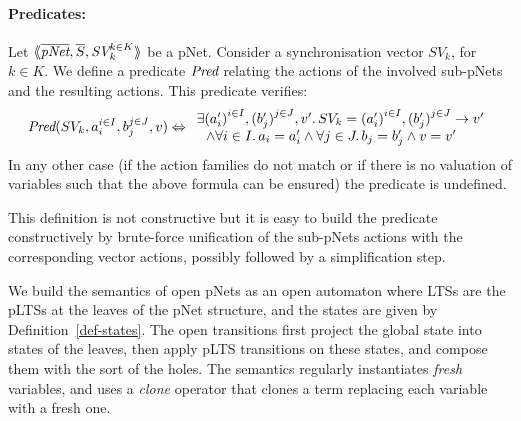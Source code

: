 \documentclass{lncs/llncs}
\newcommand{\Pred}{\symb{Pred}}
\begin{document}
\paragraph{Predicates:}
Let
$\mylangle\overline{\pNet},\overline{S},\symb{SV}_k^{k\in K} \myrangle$
be a pNet. Consider a synchronisation vector $SV_k$, for $k\in K$. We define a
predicate $\Pred$ relating
the actions of the involved sub-pNets and the resulting actions. This predicate verifies:
\[\Pred(SV_k, a_i^{i\in I}, b_j^{j\in J}, v)\Leftrightarrow
\begin{array}{l}
\exists {(a'_i)}^{i\in I},
{(b'_j)}^{j\in J},v'.\, SV_k={(a'_i)}^{i\in I}, {(b'_j)}^{j\in J}\rightarrow v'
\\~~\land
\forall i\in I.\, a_i=a'_i\land \forall j \in J.\, b_j=b'_j \land v=v'
\end{array}\]
In any other case (if the action families do not match or if there is no valuation of
variables such that the above formula can be ensured) the predicate is undefined.

This definition is not constructive but it is easy to build the predicate constructively
by brute-force unification of the sub-pNets
actions with the corresponding vector actions, possibly followed by a simplification
step.


We build the semantics of open pNets as an open automaton where LTSs are the pLTSs at
the leaves of the pNet structure, and the states are given by 
Definition~\ref{def-states}. The open transitions first
 project the global state into states of the leaves, then apply
pLTS transitions on these states, and compose them with the sort of the holes. %
The semantics   regularly instantiates \emph{fresh} variables, and uses a
\emph{clone} operator that clones a term replacing each variable with a
fresh one.
\end{document}
